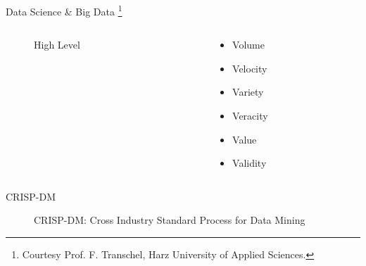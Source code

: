 
\begin{frame}{Data Science \& Big Data \footnote{Courtesy Prof. F. Transchel, Harz University of Applied Sciences.}}
	\begin{columns}
		
		\begin{column}{0.75\textwidth}
			\begin{tcolorbox}[enhanced jigsaw, colback=white, opacityback=.4, colframe=ElixirPurple, arc=3mm, boxrule=0mm, height=0.75\textheight, valign=center, title=DS Perspective]
					\begin{figure}[htbp]
					\centering
					\resizebox{0.93\columnwidth}{!}{}
					\caption{High Level}
				\end{figure}
			\end{tcolorbox}
		\end{column}
		
		\begin{column}{0.25\textwidth}
			\begin{tcolorbox}[enhanced jigsaw, colback=white, opacityback=.4, colframe=ElixirPurple, arc=3mm, boxrule=0mm, height=0.75\textheight, valign=center, title=Big Data]
				
				\begin{itemize}
					\item Volume
					\item Velocity
					\item Variety
					\vspace{3pt}
					\item Veracity
					\vspace{3pt}
					\item Value
					\item Validity
					
				\end{itemize}
				
			\end{tcolorbox}
		\end{column}
	\end{columns}
\end{frame}

\begin{frame}{CRISP-DM}
	\begin{figure}[htbp]
		\centering
		\resizebox{\columnwidth}{!}{}
		\caption{CRISP-DM: Cross Industry Standard Process for Data Mining}
	\end{figure}
\end{frame}